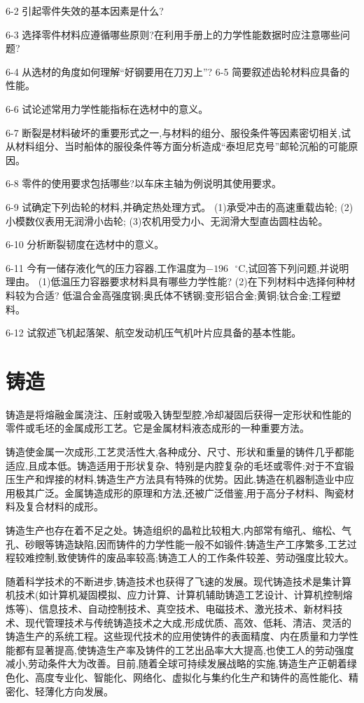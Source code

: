 \documentclass[UTF8]{ctexbook}
\newcommand{\◎}{\ensuremath{\bigcirc}}
\begin{document}
6-2 引起零件失效的基本因素是什么?

6-3 选择零件材料应遵循哪些原则?在利用手册上的力学性能数据时应注意哪些问题?

6-4 从选材的角度如何理解“好钢要用在刀刃上”?
6-5 简要叙述齿轮材料应具备的性能。

6-6 试论述常用力学性能指标在选材中的意义。

6-7 断裂是材料破坏的重要形式之一,与材料的组分、服役条件等因素密切相关,试从材料组分、当时船体的服役条件等方面分析造成“泰坦尼克号”邮轮沉船的可能原因。

6-8 零件的使用要求包括哪些?以车床主轴为例说明其使用要求。

6-9 试确定下列齿轮的材料,并确定热处理方式。
(1)承受冲击的高速重载齿轮;
(2)小模数仪表用无润滑小齿轮;
(3)农机用受力小、无润滑大型直齿圆柱齿轮。

6-10 分析断裂韧度在选材中的意义。

6-11 今有一储存液化气的压力容器,工作温度为$-196\text{ }^\circ\text{C}$,试回答下列问题,并说明理由。
(1)低温压力容器要求材料具有哪些力学性能?
(2)在下列材料中选择何种材料较为合适?
低温合金高强度钢;奥氏体不锈钢;变形铝合金;黄铜;钛合金;工程塑料。

6-12 试叙述飞机起落架、航空发动机压气机叶片应具备的基本性能。


\chapter{铸造}

铸造是将熔融金属浇注、压射或吸入铸型型腔,冷却凝固后获得一定形状和性能的零件或毛坯的金属成形工艺。它是金属材料液态成形的一种重要方法。

铸造使金属一次成形,工艺灵活性大,各种成分、尺寸、形状和重量的铸件几乎都能适应,且成本低。铸造适用于形状复杂、特别是内腔复杂的毛坯或零件;对于不宜锻压生产和焊接的材料,铸造生产方法具有特殊的优势。因此,铸造在机器制造业中应用极其广泛。金属铸造成形的原理和方法,还被广泛借鉴,用于高分子材料、陶瓷材料及复合材料的成形。

铸造生产也存在着不足之处。铸造组织的晶粒比较粗大,内部常有缩孔、缩松、气孔、砂眼等铸造缺陷,因而铸件的力学性能一般不如锻件;铸造生产工序繁多,工艺过程较难控制,致使铸件的废品率较高;铸造工人的工作条件较差、劳动强度比较大。

随着科学技术的不断进步,铸造技术也获得了飞速的发展。现代铸造技术是集计算机技术(如计算机凝固模拟、应力计算、计算机辅助铸造工艺设计、计算机控制熔炼等)、信息技术、自动控制技术、真空技术、电磁技术、激光技术、新材料技术、现代管理技术与传统铸造技术之大成,形成优质、高效、低耗、清洁、灵活的铸造生产的系统工程。这些现代技术的应用使铸件的表面精度、内在质量和力学性能都有显著提高,使铸造生产率及铸件的工艺出品率大大提高,也使工人的劳动强度减小,劳动条件大为改善。目前,随着全球可持续发展战略的实施,铸造生产正朝着绿色化、高度专业化、智能化、网络化、虚拟化与集约化生产和铸件的高性能化、精密化、轻薄化方向发展。
\end{document}
